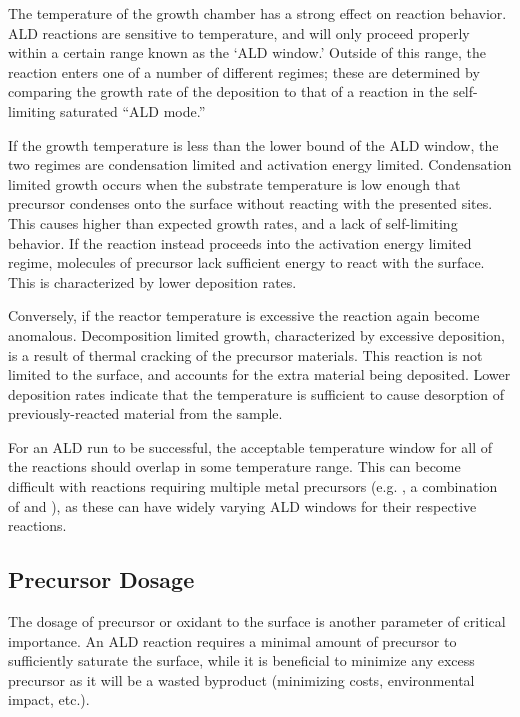 The temperature of the growth chamber has a strong effect on reaction behavior. ALD reactions are sensitive to temperature, and will only proceed properly within a certain range known as the `ALD window.' Outside of this range, the reaction enters one of a number of different regimes; these are determined by comparing the growth rate of the deposition to that of a reaction in the self-limiting saturated ``ALD mode.''\cite{ALD-Handbook,Leskela_2002,lim_atomic_2003,Ritala_ALD_2003} 

If the growth temperature is less than the lower bound of the ALD window, the two regimes are condensation limited and activation energy limited. Condensation limited growth occurs when the substrate temperature is low enough that precursor condenses onto the surface without reacting with the presented sites. This causes higher than expected growth rates, and a lack of self-limiting behavior. If the reaction instead proceeds into the activation energy limited regime, molecules of precursor lack sufficient energy to react with the surface. This is characterized by lower deposition rates.\cite{ALD-Handbook,Leskela_2002} 

Conversely, if the reactor temperature is excessive the reaction again become anomalous. Decomposition limited growth, characterized by excessive deposition, is a result of thermal cracking of the precursor materials. This reaction is not limited to the surface, and accounts for the extra material being deposited. Lower deposition rates indicate that the temperature is sufficient to cause desorption of previously-reacted material from the sample.\cite{ALD-Handbook,Ritala_ALD_2003} 

For an ALD run to be successful, the acceptable temperature window for all of the reactions should overlap in some temperature range. This can become difficult with reactions requiring multiple metal precursors (e.g. \PTO, a combination of  and ), as these can have widely varying ALD windows for their respective reactions. 


\subsection{Precursor Dosage}

The dosage of precursor or oxidant to the surface is another parameter of critical importance. An ALD reaction requires a minimal amount of precursor to sufficiently saturate the surface, while it is beneficial to minimize any excess precursor as it will be a wasted byproduct (minimizing costs, environmental impact, etc.). 

